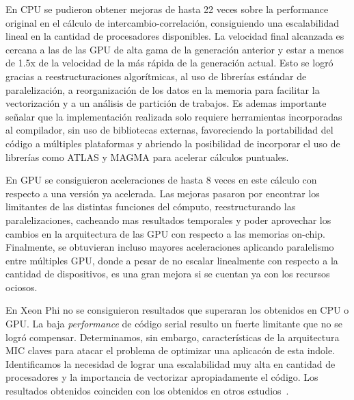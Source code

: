 En CPU se pudieron obtener mejoras de hasta 22 veces sobre la performance original en el c\'alculo de intercambio-correlaci\'on,
consiguiendo una escalabilidad lineal en la cantidad de procesadores disponibles. La velocidad final alcanzada es cercana a las de las GPU de alta gama
de la generaci\'on anterior y estar a menos de 1.5x de la velocidad de la m\'as r\'apida de la generaci\'on actual.
Esto se logr\'o gracias a reestructuraciones algor\'itmicas, al uso de librer\'ias est\'andar de paralelizaci\'on,
a reorganizaci\'on de los datos en la memoria para facilitar la vectorizaci\'on y a un an\'alisis de partici\'on de trabajos.
Es ademas importante se\~nalar que la implementaci\'on realizada solo requiere herramientas incorporadas al compilador,
sin uso de bibliotecas externas, favoreciendo la portabilidad del c\'odigo a m\'ultiples plataformas y abriendo la posibilidad
de incorporar el uso de librer\'ias como ATLAS y MAGMA para acelerar c\'alculos puntuales.

En GPU se consiguieron aceleraciones de hasta 8 veces en este c\'alculo con respecto a una versi\'on ya acelerada.
Las mejoras pasaron por encontrar los limitantes de las distintas funciones del c\'omputo, reestructurando las paralelizaciones,
cacheando mas resultados temporales y poder aprovechar los cambios en la arquitectura de las GPU con respecto a las memorias
on-chip. Finalmente, se obtuvieran incluso mayores aceleraciones aplicando paralelismo entre m\'ultiples
GPU, donde a pesar de no escalar linealmente con respecto a la cantidad de dispositivos, es una gran mejora
si se cuentan ya con los recursos ociosos.

En Xeon Phi no se consiguieron resultados que superaran los obtenidos en CPU o
GPU. La baja \textit{performance} de c\'odigo serial resulto un fuerte limitante
que no se logr\'o compensar. Determinamos, sin embargo, caracter\'isticas
de la arquitectura MIC claves para atacar el problema de optimizar una aplicac\'on de esta indole.
Identificamos la necesidad de lograr una escalabilidad muy alta en cantidad de
procesadores y la importancia de vectorizar apropiadamente el c\'odigo. Los resultados obtenidos
coinciden con los obtenidos en otros estudios~\cite{Jeffers}.

